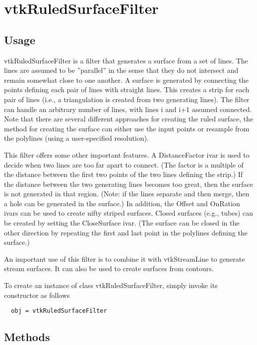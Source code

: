 \section{vtkRuledSurfaceFilter}

\subsection{Usage}

 vtkRuledSurfaceFilter is a filter that generates a surface from a set of
 lines. The lines are assumed to be ''parallel'' in the sense that they do
 not intersect and remain somewhat close to one another. A surface is
 generated by connecting the points defining each pair of lines with
 straight lines. This creates a strip for each pair of lines (i.e., a
 triangulation is created from two generating lines). The filter can handle
 an arbitrary number of lines, with lines i and i+1 assumed connected.
 Note that there are several different approaches for creating the ruled
 surface, the method for creating the surface can either use the input
 points or resample from the polylines (using a user-specified resolution).

 This filter offers some other important features. A DistanceFactor ivar is
 used to decide when two lines are too far apart to connect. (The factor is
 a multiple of the distance between the first two points of the two lines
 defining the strip.) If the distance between the two generating lines
 becomes too great, then the surface is not generated in that
 region. (Note: if the lines separate and then merge, then a hole can be
 generated in the surface.) In addition, the Offset and OnRation ivars can
 be used to create nifty striped surfaces. Closed surfaces (e.g., tubes) can
 be created by setting the CloseSurface ivar. (The surface can be closed
 in the other direction by repeating the first and last point in the
 polylines defining the surface.)

 An important use of this filter is to combine it with vtkStreamLine to
 generate stream surfaces. It can also be used to create surfaces from
 contours.

To create an instance of class vtkRuledSurfaceFilter, simply
invoke its constructor as follows
\begin{verbatim}
  obj = vtkRuledSurfaceFilter
\end{verbatim}
\subsection{Methods}


